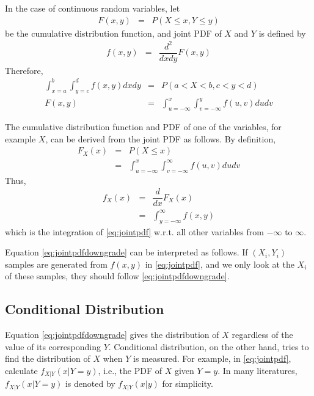 In the case of continuous random variables, let
\begin{eqnarray}
  F(x, y) &=& P(X \leq x, Y \leq y) \nonumber
\end{eqnarray}
be the cumulative distribution function, and joint PDF of $X$ and $Y$ is defined by
\begin{eqnarray}
	f(x, y) &=& \dfrac{d^2}{dxdy}F(x, y) \nonumber
\end{eqnarray}
Therefore,
\begin{eqnarray}
  \int_{x=a}^{b}\int_{y=c}^{d} f(x, y) dxdy &=& P\left(a < X < b, c < y < d \right) \label{eq:jointpdf} \\
  F(x, y) &=& \int_{u=-\infty}^{x}\int_{v=-\infty}^{y}f(u, v)dudv \nonumber
\end{eqnarray}

The cumulative distribution function and PDF of one of the variables, for example $X$, can be derived from the joint PDF as follows. By definition, 
\begin{eqnarray}
	F_X(x) &=& P(X \leq x) \nonumber \\
	&=& \int_{u=-\infty}^{x}\int_{v=-\infty}^{\infty}f(u, v)dudv \nonumber
\end{eqnarray}
Thus,
\begin{eqnarray}
	f_X(x) &=& \dfrac{d}{dx}F_X(x) \nonumber \\
	&=& \int_{y=-\infty}^{\infty} f(x, y) \label{eq:jointpdfdowngrade}
\end{eqnarray}
which is the integration of \eqref{eq:jointpdf} w.r.t. all other variables from $-\infty$ to $\infty$. 

Equation \eqref{eq:jointpdfdowngrade} can be interpreted as follows. If $(X_i, Y_i)$ samples are generated from $f(x, y)$ in \eqref{eq:jointpdf}, and we only look at the $X_i$ of these samples, they should follow \eqref{eq:jointpdfdowngrade}.

\subsection{Conditional Distribution}

Equation \eqref{eq:jointpdfdowngrade} gives the distribution of $X$ regardless of the value of its corresponding $Y$. Conditional distribution, on the other hand, tries to find the distribution of $X$ when $Y$ is measured. For example, in \eqref{eq:jointpdf}, calculate $f_{X|Y}(x |Y=y)$, i.e., the PDF of $X$ given $Y=y$. In many literatures, $f_{X|Y}(x |Y=y)$ is denoted by $f_{X|Y}(x|y)$ for simplicity.

